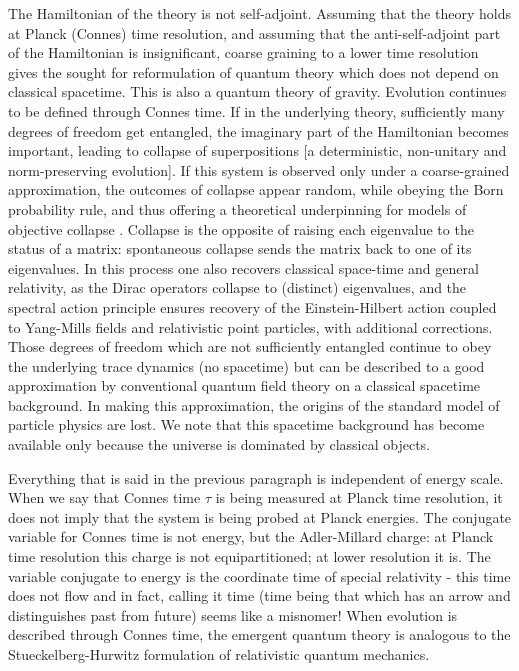 \documentclass[a4paper]{jpconf}
\begin{document}
 The Hamiltonian of the theory is not self-adjoint. Assuming that the theory holds at Planck (Connes) time resolution, and assuming that the anti-self-adjoint part of the Hamiltonian is insignificant, coarse graining to a lower time resolution gives the sought for reformulation of quantum theory which does not depend on classical spacetime. This is also a quantum theory of gravity. Evolution continues to be defined through Connes time. If in the underlying theory, sufficiently many degrees of freedom get entangled, the imaginary part of the Hamiltonian becomes important, leading to collapse of superpositions [a deterministic, non-unitary and norm-preserving evolution]. If this system is observed only under a coarse-grained approximation, the outcomes of collapse appear random, while obeying the Born probability rule, and thus offering a theoretical underpinning for models of objective collapse \cite{Kakade}. Collapse is the opposite of raising each eigenvalue to the status of a matrix: spontaneous collapse sends the matrix back to one of its eigenvalues. In this process one also recovers classical space-time and general relativity, as the Dirac operators collapse to (distinct) eigenvalues, and the spectral action principle ensures recovery of the Einstein-Hilbert action coupled to Yang-Mills fields and relativistic point particles, with additional corrections. Those degrees of freedom which are not sufficiently entangled continue to obey the underlying trace dynamics (no spacetime) but can be described to a  good approximation by conventional quantum field theory on a classical spacetime background. In making this approximation, the origins of the standard model of particle physics are lost. We note that this spacetime background has become available only because the universe is dominated by classical objects.
 
 Everything that is said in the previous paragraph is independent of energy scale. When we say that Connes time $\tau$ is being measured at Planck time resolution, it does not imply that the system is being probed at Planck energies. The conjugate variable for Connes time is not energy, but the Adler-Millard charge: at Planck time resolution this charge is not equipartitioned; at lower resolution it is. The variable conjugate to energy is the coordinate time of special relativity - this time does not flow and in fact, calling it time (time being that which has an arrow and distinguishes past from future) seems like a misnomer! When evolution is described through Connes time, the emergent quantum theory is analogous to the Stueckelberg-Hurwitz formulation of relativistic quantum mechanics.
 
\end{document}
